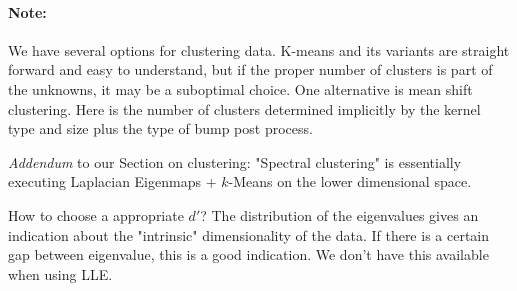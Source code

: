 \paragraph{Note:}
We have several options for clustering data. K-means and its variants are straight forward and easy to understand, but if the proper number of clusters is part of the unknowns, it may be a suboptimal choice.
One alternative is mean shift clustering. Here is the number of clusters determined implicitly by the kernel type and size plus the type of bump post process.



\textit{Addendum} to our Section on clustering: "Spectral clustering" is essentially executing Laplacian Eigenmaps + \(k\)-Means on the lower dimensional space.

How to choose a appropriate \(d'\)? The distribution of the eigenvalues gives an indication about the "intrinsic" dimensionality of the data. If there is a certain gap between eigenvalue, this is a good indication. We don't have this available when using LLE.
